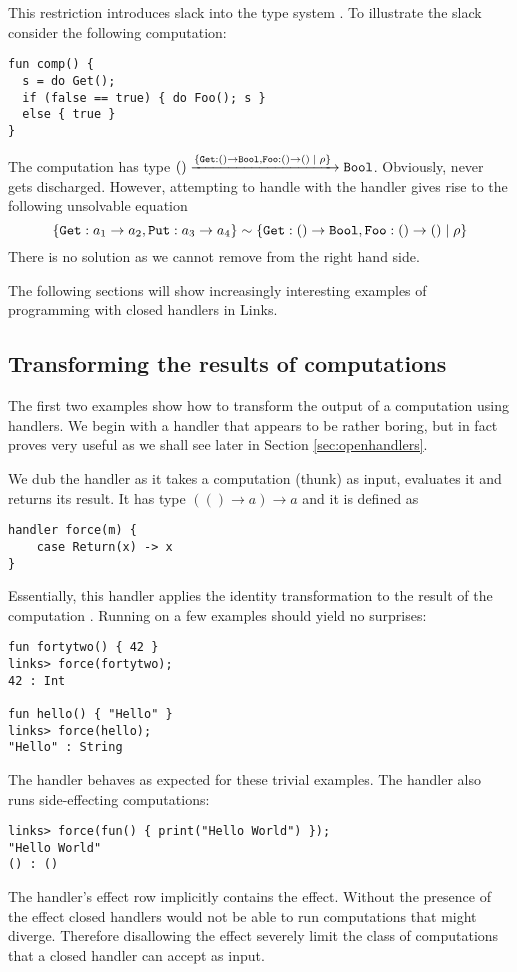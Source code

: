 This restriction introduces slack into the type system \cite{Huttel2010}. To illustrate the slack consider the following computation:
\begin{lstlisting}[style=links]
fun comp() {
  s = do Get();
  if (false == true) { do Foo(); s }
  else { true }
}
\end{lstlisting}
The computation  has type $() \xrightarrow{ \{ \texttt{Get}:() \to \texttt{Bool},\texttt{Foo}:() \to () \; | \; \rho \}\;} \texttt{Bool}$. Obviously,  never gets discharged. However, attempting to handle  with the handler  gives rise to the following unsolvable equation 
\[ \{\texttt{Get}: a_1 \to a_2, \texttt{Put} : a_3 \to a_4 \} \sim \{\texttt{Get}:() \to \texttt{Bool},\texttt{Foo}:() \to () \; | \; \rho \}\]
There is no solution as we cannot remove  from the right hand side.

The following sections will show increasingly interesting examples of programming with closed handlers in Links.

\subsection{Transforming the results of computations}\label{sec:transform}
The first two examples show how to transform the output of a computation using handlers. We begin with a handler that appears to be rather boring, but in fact proves very useful as we shall see later in Section \ref{sec:openhandlers}.
\begin{example}\label{ex:force}
We dub the handler  as it takes a computation (thunk) as input, evaluates it and returns its result. It has type $(() \to a) \to a$ and it is defined as
\begin{lstlisting}[style=links]
handler force(m) {
    case Return(x) -> x
}
\end{lstlisting}
Essentially, this handler applies the identity transformation to the result of the computation . Running  on a few examples should yield no surprises:
\begin{lstlisting}[style=links]
fun fortytwo() { 42 }
links> force(fortytwo);
42 : Int

fun hello() { "Hello" }
links> force(hello);
"Hello" : String
\end{lstlisting}
The handler  behaves as expected for these trivial examples. The  handler also runs side-effecting computations:
\begin{lstlisting}[style=links]
links> force(fun() { print("Hello World") });
"Hello World"
() : ()
\end{lstlisting}
The  handler's effect row implicitly contains the  effect. Without the presence of the  effect closed handlers would not be able to run computations that might diverge. Therefore disallowing the  effect severely limit the class of computations that a closed handler can accept as input.
\end{example}

